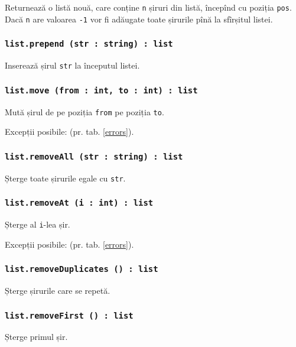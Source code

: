 Returnează o listă nouă, care conține \texttt{n} șiruri din listă, începînd cu poziția \texttt{pos}. Dacă \texttt{n} are valoarea \texttt{-1} vor fi adăugate toate șirurile pînă la sfîrșitul listei.

\subsubsection{\texttt{list.prepend (str : string) : list}}

Inserează șirul \texttt{str} la începutul listei.

\subsubsection{\texttt{list.move (from : int, to : int) : list}}

Mută șirul de pe poziția \texttt{from} pe poziția \texttt{to}.

Excepții posibile:  (pr. tab. \ref{errors}).

\subsubsection{\texttt{list.removeAll (str : string) : list}}

Șterge toate șirurile egale cu \texttt{str}.

\subsubsection{\texttt{list.removeAt (i : int) : list}}

Șterge al \texttt{i}-lea șir.

Excepții posibile:  (pr. tab. \ref{errors}).

\subsubsection{\texttt{list.removeDuplicates () : list}}

Șterge șirurile care se repetă.

\subsubsection{\texttt{list.removeFirst () : list}}

Șterge primul șir.


